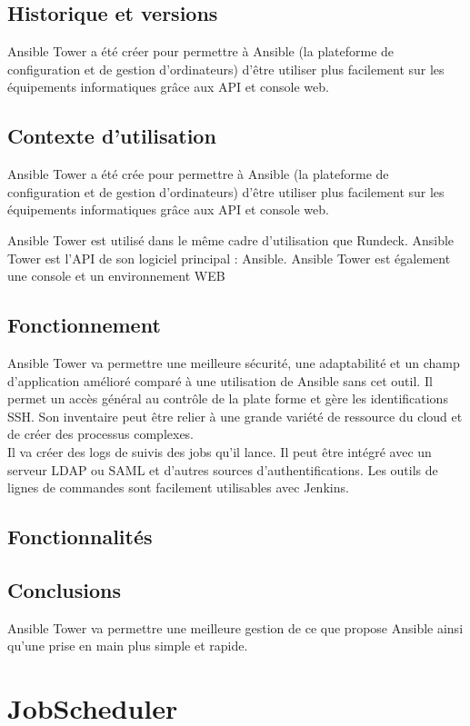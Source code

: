 \documentclass[12pt]{article}
\begin{document}
\subsection{Historique et versions}
Ansible Tower a été créer pour permettre à Ansible (la plateforme de configuration et de gestion d’ordinateurs) d’être utiliser plus facilement sur les équipements informatiques grâce aux API et console web.

\subsection{Contexte d'utilisation}
Ansible Tower a été crée pour permettre à Ansible (la plateforme de configuration et de gestion d’ordinateurs) d’être utiliser plus facilement sur les équipements informatiques grâce aux API et console web.

Ansible Tower est utilisé dans le même cadre d'utilisation que Rundeck. Ansible Tower est l'API de son logiciel principal : Ansible. Ansible Tower est également une console et un environnement WEB

\subsection{Fonctionnement}
Ansible Tower va permettre une meilleure sécurité, une adaptabilité et un champ d’application amélioré comparé à une utilisation de Ansible sans cet outil. Il permet un accès général au contrôle de la plate forme et gère les identifications SSH. Son inventaire peut être relier à une grande variété de ressource du cloud et de créer des processus complexes. 
\\
Il va créer des logs de suivis des jobs qu’il lance. Il peut être intégré avec un serveur LDAP ou SAML et d’autres sources d’authentifications. Les outils de lignes de commandes sont facilement utilisables avec Jenkins.

\subsection{Fonctionnalités}
\subsection{Conclusions}
Ansible Tower va permettre une meilleure gestion de ce que propose Ansible ainsi qu'une prise en main plus simple et rapide.

\section{JobScheduler}
\end{document}
